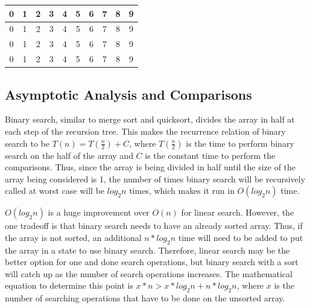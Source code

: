 \documentclass[letterpaper, 10pt,DIV=13]{scrartcl}
\numberwithin{equation}{section} %
\numberwithin{figure}{section} %
\numberwithin{table}{section} %
\begin{document}
\begin{center}
  \begin{tabular}{|c|c|c|c|c|c|c|c|c|c|}
    \hline
    \rowcolor{blue!20}0 & 1 & 2 & 3 & 4 & 5 & 6 & 7 & 8 & 9 \\
    \hline
    0 & 1 & 2 & 3 & 4 & \cellcolor{blue!20}5 & \cellcolor{blue!20}6 & \cellcolor{blue!20}7 & \cellcolor{blue!20}8 & \cellcolor{blue!20}9 \\
    \hline
    0 & 1 & 2 & 3 & 4 & \cellcolor{blue!20}5 & \cellcolor{blue!20}6 & 7 & 8 & 9 \\
    \hline
    0 & 1 & 2 & 3 & 4 & 5 & \cellcolor{blue!20}6 & 7 & 8 & 9 \\
    \hline
  \end{tabular}
\label{figure:binarySearch}
\end{center}

\subsection{Asymptotic Analysis and Comparisons}
Binary search, similar to merge sort and quicksort, divides the array in half at each step of the recursion tree. This makes the recurrence relation of binary search to be $T(n) = T(\frac{n}{2}) + C$, where $T(\frac{n}{2})$ is the time to perform binary search on the half of the array and $C$ is the constant time to perform the comparisons. Thus, since the array is being divided in half until the size of the array being considered is 1, the number of times binary search will be recursively called at worst case will be $log_2n$ times, which makes it run in $O(log_2n)$ time.

$O(log_2n)$ is a huge improvement over $O(n)$ for linear search. However, the one tradeoff is that binary search needs to have an already sorted array. Thus, if the array is not sorted, an additional $n * log_2n$ time will need to be added to put the array in a state to use binary search. Therefore, linear search may be the better option for one and done search operations, but binary search with a sort will catch up as the number of search operations increases. The mathematical equation to determine this point is $x * n > x * log_2n + n * log_2n$, where $x$ is the number of searching operations that have to be done on the unsorted array.
\end{document}
